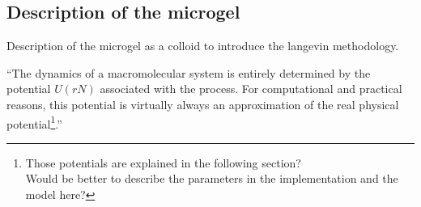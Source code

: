 \documentclass[../../main-notes.tex]{subfiles}
\begin{document}
\begin{comment}
Theory of simple liquids 
Computational Physics\citep{Thijssen2007}

The opposite situation is given by a system that remains in strong thermal contact with another system at thermal equilib-equilibrium. 
The prototype of such behavior is provided by small particles that interact among themselves with a given force (which may be electrical,magnetic, gravitational, etc., in origin) suspended in a highly viscousliquid (i.e., oil) at a given temperature. 
In the high-viscosity limit the equation of motion of the ith particle is

 The missing term in Eq.A9.1 is the force acting on the particles due to the collisions of themolecules of oil: they produce an extra random force $b(t)$, which shouldbe added to A9.2. 
 We have
This new force prevents the particles from remaining at the minimumposition (xim), and it is the origin of the Brownian motion.

In the simplest case, each collision gives a contribution to theforce, and contributions coming from different collisions are uncorre-lated: the forces acting on the same particle at different times (or ondifferent particles at the same time) are practically uncorrelated. We canthuswrite

Where the bar denotes the average over many repeated experiments: i.e.,we have M identical copies of the same system (or a single system onwhich M measurements are taken at widely separated time intervals) andwe average the $B'(t)$ over these M replicas. The bar denotes theaverage when M goes to infinity. If the number of collisions in a time e isquite large, the $B'(t)$ will be Gaussian-distributed variables with avariance\footnote{Explanaition of why gaussian in page 25}
~\citep{Parisi1988}

\end{comment}


\subsection{Description of the microgel}
Description of the microgel as a colloid to introduce the langevin methodology.

“The dynamics of a macromolecular system is entirely determined by the potential $U(rN)$ associated with the process. For computational and practical reasons, this potential is virtually always an approximation of the real physical potential\footnote{Those potentials are explained in the following section?\\ Would be better to describe the parameters in the implementation and the model here?}.”\citep{paquetMolecularDynamicsMonte2015}
\end{document}
